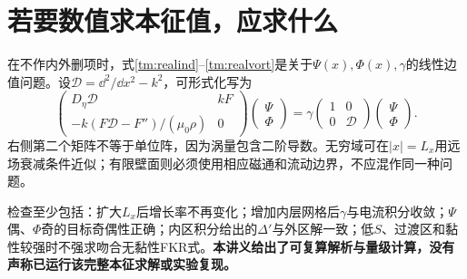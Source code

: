 \section{若要数值求本征值，应求什么}
在不作内外删项时，式\eqref{tm:realind}--\eqref{tm:realvort}是关于$\Psi(x),\Phi(x),\gamma$的线性边值问题。设$\mathcal D=\dd^2/\dd x^2-k^2$，可形式化写为
\begin{equation}
 \begin{pmatrix}
 D_\eta\mathcal D&kF\\
 -k(F\mathcal D-F'')/(\mu_0\rho)&0
 \end{pmatrix}
 \begin{pmatrix}\Psi\\\Phi\end{pmatrix}
 =\gamma
 \begin{pmatrix}1&0\\0&\mathcal D\end{pmatrix}
 \begin{pmatrix}\Psi\\\Phi\end{pmatrix}.
\end{equation}
右侧第二个矩阵不等于单位阵，因为涡量包含二阶导数。无穷域可在$|x|=L_x$用远场衰减条件近似；有限壁面则必须使用相应磁通和流动边界，不应混作同一种问题。

检查至少包括：扩大$L_x$后增长率不再变化；增加内层网格后$\gamma$与电流积分收敛；$\Psi$偶、$\Phi$奇的目标奇偶性正确；内区积分给出的$\Delta'$与外区解一致；低$S$、过渡区和黏性较强时不强求吻合无黏性FKR式。\textbf{本讲义给出了可复算解析与量级计算，没有声称已运行该完整本征求解或实验复现。}
